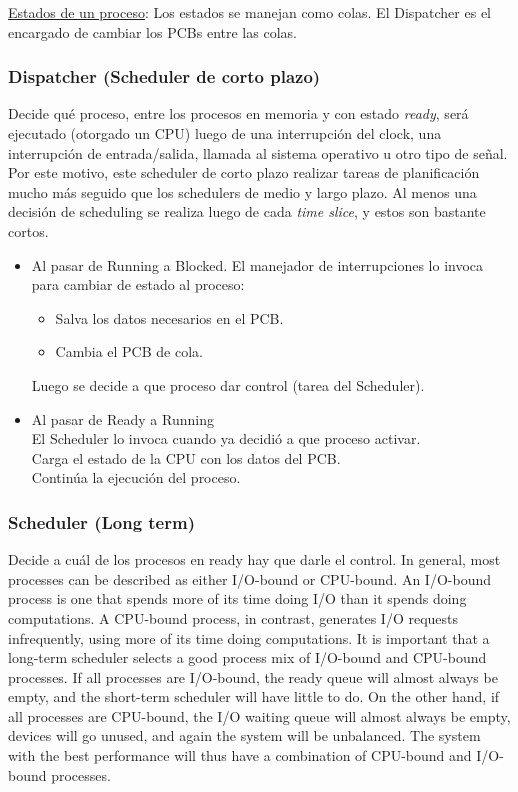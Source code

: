 \documentclass[a4paper, twoside]{article}
\begin{document}
\underline{Estados de un proceso}:
Los estados se manejan como colas.
El Dispatcher es el encargado de cambiar los PCBs entre las colas.

\subsubsection{Dispatcher (Scheduler de corto plazo)}

Decide qué proceso, entre los procesos en memoria y con estado \emph{ready},
será ejecutado (otorgado un CPU) luego de una interrupción del clock,
una interrupción de entrada/salida, llamada al sistema operativo u otro tipo de
señal.
Por este motivo, este scheduler de corto plazo realizar tareas de planificación
mucho más seguido que los schedulers de medio y largo plazo.
Al menos una decisión de scheduling se realiza luego de cada \emph{time slice},
y estos son bastante cortos.

\begin{itemize}
  \item Al pasar de Running a Blocked.
  El manejador de interrupciones lo invoca para cambiar de estado al proceso:
  \begin{itemize}
    \item Salva los datos necesarios en el PCB.
    \item Cambia el PCB de cola.
  \end{itemize}
  Luego se decide a que proceso dar control (tarea del Scheduler).

  \item Al pasar de Ready a Running\\
  El Scheduler lo invoca cuando ya decidió a que proceso activar.\\
  Carga el estado de la CPU con los datos del PCB.\\
  Continúa la ejecución del proceso.
\end{itemize}

\subsubsection{Scheduler (Long term)}
Decide a cuál de los procesos en ready hay que darle el control.
In general, most processes can be described as either I/O-bound or CPU-bound.
An I/O-bound process is one that spends more of its time doing I/O than it
spends doing computations.
A CPU-bound process, in contrast, generates I/O requests infrequently, using
more of its time doing computations.
It is important that a long-term scheduler selects a good process mix of
I/O-bound and CPU-bound processes.
If all processes are I/O-bound, the ready queue will almost always be empty,
and the short-term scheduler will have little to do. On the other hand, if all
processes are CPU-bound, the I/O waiting queue will almost always be empty,
devices will go unused, and again the system will be unbalanced.
The system with the best performance will thus have a combination of CPU-bound
and I/O-bound processes.\\
\end{document}

